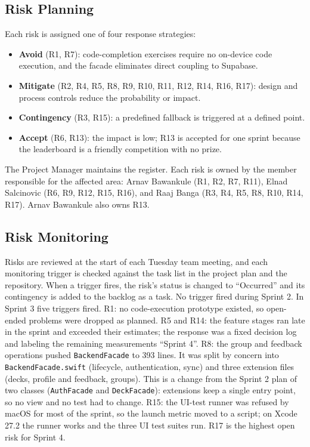 \documentclass[12pt,letterpaper]{article}
\begin{document}
\subsection{Risk Planning}
Each risk is assigned one of four response strategies:
\begin{itemize}
  \item \textbf{Avoid} (R1, R7): code-completion exercises require no on-device code
        execution, and the facade eliminates direct coupling to Supabase.
  \item \textbf{Mitigate} (R2, R4, R5, R8, R9, R10, R11, R12, R14, R16, R17): design
        and process controls reduce the probability or impact.
  \item \textbf{Contingency} (R3, R15): a predefined fallback is triggered at a
        defined point.
  \item \textbf{Accept} (R6, R13): the impact is low; R13 is accepted for one sprint
        because the leaderboard is a friendly competition with no prize.
\end{itemize}
The Project Manager maintains the register. Each risk is owned by the member
responsible for the affected area: Arnav Bawankule (R1, R2, R7, R11), Elnad
Salcinovic (R6, R9, R12, R15, R16), and Raaj Banga (R3, R4, R5, R8, R10, R14, R17).
Arnav Bawankule also owns R13.

\subsection{Risk Monitoring}
Risks are reviewed at the start of each Tuesday team meeting, and each monitoring
trigger is checked against the task list in the project plan and the repository. When a trigger fires, the risk's
status is changed to ``Occurred'' and its contingency is added to the backlog as a
task. No trigger fired during Sprint 2. In Sprint 3 five triggers fired. R1: no
code-execution prototype existed, so open-ended problems were dropped as planned.
R5 and R14: the feature stages ran late in the sprint and exceeded their estimates;
the response was a fixed decision log and labeling the remaining measurements
``Sprint 4''. R8: the group and feedback operations pushed \texttt{BackendFacade} to
393 lines. It was split by concern into \texttt{BackendFacade.swift} (lifecycle,
authentication, sync) and three extension files (decks, profile and feedback, groups).
This is a change from the Sprint 2 plan of two classes (\texttt{AuthFacade} and
\texttt{DeckFacade}): extensions keep a single entry point, so no view and no test had
to change. R15: the UI-test runner was refused by macOS for most of the sprint, so the
launch metric moved to a script; on Xcode 27.2 the runner works and the three UI test
suites run. R17 is the highest open risk for Sprint 4.
\end{document}

